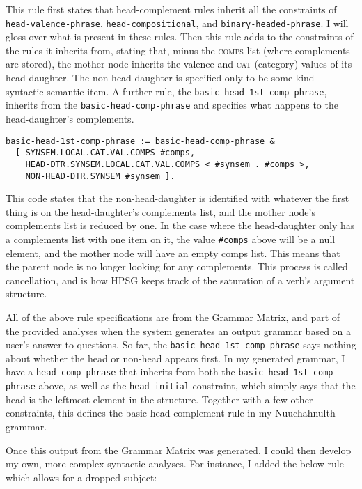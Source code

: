 This rule first states that head-complement rules inherit all the constraints of \texttt{head-valence-phrase}, \texttt{head-compositional}, and \texttt{binary-headed-phrase}. I will gloss over what is present in these rules. Then this rule adds to the constraints of the rules it inherits from, stating that, minus the \textsc{comps} list (where complements are stored), the mother node inherits the valence and \textsc{cat} (category) values of its head-daughter. The non-head-daughter is specified only to be some kind syntactic-semantic item. A further rule, the \texttt{basic-head-1st-comp-phrase}, inherits from the \texttt{basic-head-comp-phrase} and specifies what happens to the head-daughter's complements.

\begin{verbatim}
basic-head-1st-comp-phrase := basic-head-comp-phrase &
  [ SYNSEM.LOCAL.CAT.VAL.COMPS #comps,
    HEAD-DTR.SYNSEM.LOCAL.CAT.VAL.COMPS < #synsem . #comps >,
    NON-HEAD-DTR.SYNSEM #synsem ].
\end{verbatim}

This code states that the non-head-daughter is identified with whatever the first thing is on the head-daughter's complements list, and the mother node's complements list is reduced by one. In the case where the head-daughter only has a complements list with one item on it, the value \texttt{\#comps} above will be a null element, and the mother node will have an empty comps list. This means that the parent node is no longer looking for any complements. This process is called cancellation, and is how HPSG keeps track of the saturation of a verb's argument structure.

All of the above rule specifications are from the Grammar Matrix, and part of the provided analyses when the system generates an output grammar based on a user's answer to questions. So far, the \texttt{\justify basic-head-1st-comp-phrase} says nothing about whether the head or non-head appears first. In my generated grammar, I have a \texttt{head-comp-phrase} that inherits from both the \texttt{\justify basic-head-1st-comp-phrase} above, as well as the \texttt{head-initial} constraint, which simply says that the head is the leftmost element in the structure. Together with a few other constraints, this defines the basic head-complement rule in my Nuuchahnulth grammar.

Once this output from the Grammar Matrix was generated, I could then develop my own, more complex syntactic analyses. For instance, I added the below rule which allows for a dropped subject:

